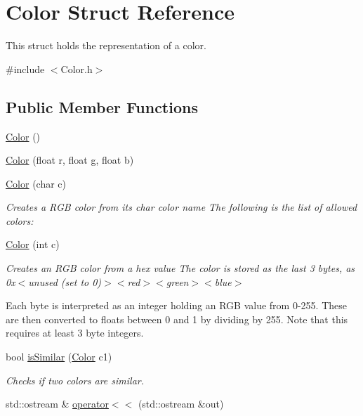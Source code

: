 \hypertarget{structColor}{\section{Color Struct Reference}
\label{structColor}
}


This struct holds the representation of a color.  




{\ttfamily \#include $<$Color.\-h$>$}

\subsection*{Public Member Functions}
\begin{DoxyCompactItemize}
\item 
\hyperlink{structColor_a9a742cbe9f9f4037f5d9f4e81a9b2428}{Color} ()
\item 
\hyperlink{structColor_a373c542c99fb83ce9c7c08aae76b2718}{Color} (float r, float g, float b)
\item 
\hyperlink{structColor_ade5cd4cc07dfaf745089dce14e47c31b}{Color} (char c)
\begin{DoxyCompactList}\small\item\em Creates a R\-G\-B color from its char color name  The following is the list of allowed colors\-: \end{DoxyCompactList}\item 
\hyperlink{structColor_a2023dcb2762807f60730e0787abc4788}{Color} (int c)
\begin{DoxyCompactList}\small\item\em Creates an R\-G\-B color from a hex value  The color is stored as the last 3 bytes, as 0x$<$unused (set to 0)$>$$<$red$>$$<$green$>$$<$blue$>$\par
 Each byte is interpreted as an integer holding an R\-G\-B value from 0-\/255. These are then converted to floats between 0 and 1 by dividing by 255. Note that this requires at least 3 byte integers. \end{DoxyCompactList}\item 
bool \hyperlink{structColor_a93e73674565d6205f8c777aeb2a05524}{is\-Similar} (\hyperlink{structColor}{Color} c1)
\begin{DoxyCompactList}\small\item\em Checks if two colors are similar. \end{DoxyCompactList}\item 
std\-::ostream \& \hyperlink{structColor_a0af0a6b6bc80cdb89f39a931c003ebc7}{operator$<$$<$} (std\-::ostream \&out)

\end{DoxyCompactItemize}
